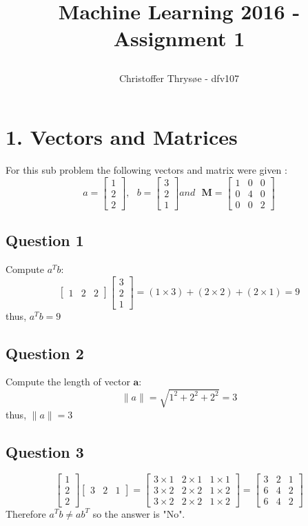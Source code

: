 \documentclass{article}
\title{
\vspace{1in}
\textmd{\textbf{Machine Learning 2016 - Assignment 1}} \\
\author{Christoffer Thrysøe - dfv107}
}
\begin{document}
\maketitle
{}
\section{1. Vectors and Matrices}
For this sub problem the following vectors and matrix were given :
$$
a = \begin{bmatrix}
1\\
2\\
2\end{bmatrix}, \textbf{ }
b = \begin{bmatrix}
3\\
2\\
1\end{bmatrix} and \textbf{ }
\mathbf{M} = \begin{bmatrix}
1&0&0\\
0&4&0\\
0&0&2\end{bmatrix}
$$

\subsection{Question 1}
Compute $ a^Tb $:
$$
\begin{bmatrix}
1 & 2 & 2\end{bmatrix}
\begin{bmatrix}
3\\
2\\
1\end{bmatrix}
= (1 \times 3) + ( 2 \times 2) + (2 \times 1) = 9
$$
thus, $a^Tb=9$
\subsection{Question 2}
Compute the length of vector $\textbf{a}$:
$$ \|a\| = \sqrt{ 1^2 + 2^2 + 2^2} = 3 $$ 
thus, $\|a\| = 3$
\subsection{Question 3}
$$
\begin{bmatrix}
1\\
2\\
2\end{bmatrix}
\begin{bmatrix}
3 & 2 & 1\end{bmatrix}
=
\begin{bmatrix}
3 \times 1 & 2 \times 1 &1 \times 1 \\
3 \times 2 & 2 \times 2 & 1 \times 2 \\
3 \times 2 & 2 \times 2 & 1 \times 2 \end{bmatrix}
=
\begin{bmatrix}
3 & 2 & 1 \\
6 & 4 & 2 \\
6 & 4 & 2
\end{bmatrix}
$$
Therefore 
$a^Tb \neq ab^T$ so the answer is "No".
\end{document}
